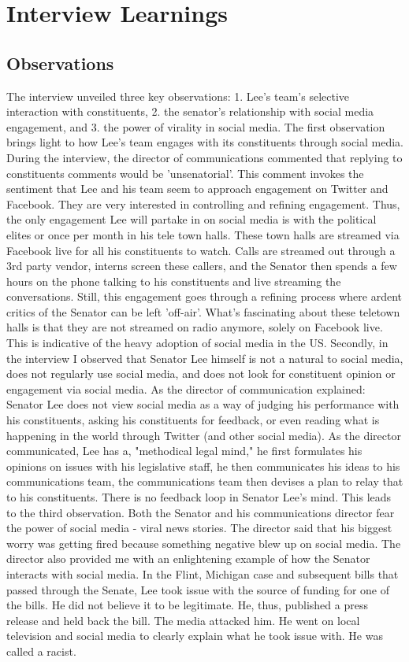 \documentclass{article}
\begin{document}
\section{Interview Learnings}
\subsection{Observations}
\begin{flushleft}
The interview unveiled three key observations: 1. Lee's team's selective interaction with constituents, 2. the senator's relationship with social media engagement, and 3. the power of virality in social media. The first observation brings light to how Lee's team engages with its constituents through social media. During the interview, the director of communications commented that replying to constituents comments would be 'unsenatorial'. This comment invokes the sentiment that Lee and his team seem to approach engagement on Twitter and Facebook. They are very interested in controlling and refining engagement. Thus, the only engagement Lee will partake in on social media is with the political elites or once per month in his tele town halls. These town halls are streamed via Facebook live for all his constituents to watch. Calls are streamed out through a 3rd party vendor, interns screen these callers, and the Senator then spends a few hours on the phone talking to his constituents and live streaming the conversations. Still, this engagement goes through a refining process where ardent critics of the Senator can be left 'off-air'. What's fascinating about these teletown halls is that they are not streamed on radio anymore, solely on Facebook live. This is indicative of the heavy adoption of social media in the US. Secondly, in the interview I observed that Senator Lee himself is not a natural to social media, does not regularly use social media, and does not look for constituent opinion or engagement via social media. As the director of communication explained: Senator Lee does not view social media as a way of judging his performance with his constituents, asking his constituents for feedback, or even reading what is happening in the world through Twitter (and other social media). As the director communicated, Lee has a, "methodical legal mind," he first formulates his opinions on issues with his legislative staff, he then communicates his ideas to his communications team, the communications team then devises a plan to relay that to his constituents. There is no feedback loop in Senator Lee's mind. This leads to the third observation. Both the Senator and his communications director fear the power of social media - viral news stories. The director said that his biggest worry was getting fired because something negative blew up on social media. The director also provided me with an enlightening example of how the Senator interacts with social media. In the Flint, Michigan case and subsequent bills that passed through the Senate, Lee took issue with the source of funding for one of the bills. He did not believe it to be legitimate. He, thus, published a press release and held back the bill. The media attacked him. He went on local television and social media to clearly explain what he took issue with. He was called a racist. 
\end{flushleft}
\end{document}
